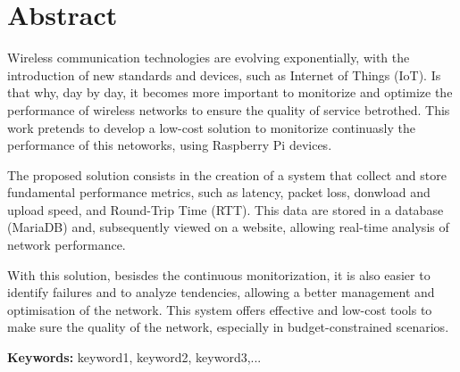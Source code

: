 
\section*{Abstract}


Wireless communication technologies are evolving exponentially, with the 
introduction of new standards and devices, such as Internet of Things (IoT).
Is that why, day by day, it becomes more important to monitorize and optimize
the performance of wireless networks to ensure the quality of service betrothed.
This work pretends to develop a low-cost solution to monitorize continuasly the
performance of this netoworks, using Raspberry Pi devices.

The proposed solution consists in the creation of a system that collect and 
store fundamental performance metrics, such as latency, packet loss, donwload and
upload speed, and Round-Trip Time (RTT). This data are stored in a database 
(MariaDB) and, subsequently viewed on a website, allowing real-time analysis 
of network performance.

With this solution, besisdes the continuous monitorization, it is also easier
to identify failures and to analyze tendencies, allowing a better management and 
optimisation of the network. This system offers effective and low-cost tools to 
make sure the quality of the network, especially in budget-constrained scenarios.  


\vfill

\textbf{\Large Keywords:} keyword1, keyword2, keyword3,...

